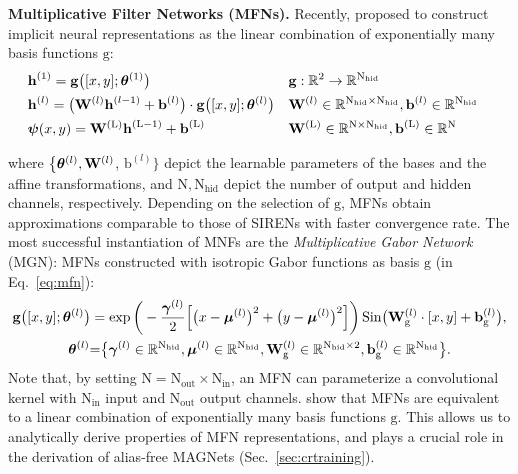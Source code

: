 \documentclass{article} \usepackage{iclr2022_conference,times}
\def\sR{{\mathbb{R}}}
\newcommand{\mat}[1]{\ensuremath{{\mathbf{\MakeUppercase{{#1}}}}}}
\newcommand{\Wm}{\mat{W}}
\newcommand{\W}{\Wm}
\def\Nt{\mathrm{N}}
\def\sR{{\mathbb{R}}}
\begin{document}
\textbf{Multiplicative Filter Networks (MFNs).} Recently, \citet{fathony2021multiplicative} proposed to construct implicit neural representations as the linear combination of exponentially many basis functions $\boldsymbol{\mathrm{g}}$:
\vspace{-0.5mm}
\begin{align}
    \label{eq:mfn}
    &\boldsymbol{\mathrm{h}}^{(1)} = \boldsymbol{\mathrm{g}}\big( [x,y]; \boldsymbol{\theta}^{(1)}\big) && \boldsymbol{\mathrm{g}}: \sR^{2} \rightarrow \sR^{\Nt_{\mathrm{hid}}}\\
    &\boldsymbol{\mathrm{h}}^{(l)} = \big(\Wm^{(l)} \boldsymbol{\mathrm{h}}^{(l-1)} + \boldsymbol{\mathrm{b}}^{(l)}\big) \cdot   \boldsymbol{\mathrm{g}}\big( [x,y] ; \boldsymbol{\theta}^{(l)}\big) && \Wm^{(l)} \in \sR^{\Nt_{\mathrm{hid}} \times \Nt_{\mathrm{hid}}}, \boldsymbol{\mathrm{b}}^{(l)} \in \sR^{\Nt_{\mathrm{hid}}} \quad \\
    &\boldsymbol{\psi}(x, y) = \Wm^{(\mathrm{L})} \boldsymbol{\mathrm{h}}^{(\mathrm{L}-1)} + \boldsymbol{\mathrm{b}}^{(\mathrm{L})} && \Wm^{(\mathrm{L})} \in \sR^{\Nt \times \Nt_{\mathrm{hid}}}, \boldsymbol{\mathrm{b}}^{(\mathrm{L})} \in \sR^{\Nt}
\end{align}
\vspace{-5.5mm}

where $\big\{\boldsymbol{\theta}^{(l)}, \W^{(l)}$, $\boldsymbol{\mathrm{b}}^{(l)}\big\}$ depict the learnable parameters of the bases and the affine transformations, and $\Nt, \Nt_{\mathrm{hid}}$ depict the number of output and hidden channels, respectively. Depending on the selection of $\boldsymbol{\mathrm{g}}$, MFNs obtain approximations comparable to those of SIRENs \citep{sitzmann2020implicit} with faster convergence rate. The most successful instantiation of MNFs are the \textit{Multiplicative Gabor Network} (MGN): MFNs constructed with isotropic Gabor functions as basis $\boldsymbol{\mathrm{g}}$ (in Eq.~\ref{eq:mfn}):
\vspace{-1mm}
\begin{gather}
    \boldsymbol{\mathrm{g}}\big( [x,y] ; \boldsymbol{\theta}^{(l)}\big) = \exp \bigg(-\frac{\boldsymbol{\gamma}^{(l)}}{2} \Big[ \big(x-\boldsymbol{\mu}^{(l)}\big)^{2} + \big(y-\boldsymbol{\mu}^{(l)}\big)^{2}\Big] \bigg)\, \mathrm{Sin} \big(\Wm_\mathrm{g}^{(l)} \cdot [x, y] + \boldsymbol{\mathrm{b}}_\mathrm{g}^{(l)} \big), \\
    \boldsymbol{\theta}^{(l)} {=} \big\{ \boldsymbol{\gamma}^{(l)} \in \sR^{\Nt_{\mathrm{hid}}}, \boldsymbol{\mu}^{(l)} \in \sR^{\Nt_{\mathrm{hid}}},\Wm_\mathrm{g}^{(l)} \in \sR^{\Nt_{\mathrm{hid}} \times 2}, \boldsymbol{\mathrm{b}}_\mathrm{g}^{(l)} \in \sR^{\Nt_{\mathrm{hid}}} \big\}.
\end{gather}
Note that, by setting $\Nt{=}\Nt_{\textrm{out}}{\times} \Nt_{\textrm{in}}$, an MFN can parameterize a convolutional kernel with $\Nt_{\textrm{in}}$ input and $\Nt_{\textrm{out}}$ output channels.
\citet{fathony2021multiplicative} show that MFNs are equivalent to a linear combination of exponentially many basis functions $\boldsymbol{\mathrm{g}}$. This allows us to analytically derive properties of MFN representations, and plays a crucial role in the derivation of alias-free MAGNets (Sec.~\ref{sec:crtraining}).
\end{document}
